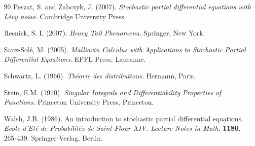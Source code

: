 \documentclass[12pt]{article}
\begin{document}
\begin{thebibliography}{99}
  Peszat, S. and Zabczyk, J. (2007). {\em Stochastic partial differential equations with L\'evy noise}. Cambridge University Press.
     
 
 Resnick, S. I. (2007). {\em Heavy Tail Phenomena}. 
 Springer, New York.         


   
 Sanz-Sol\'e, M. (2005). {\em Malliavin Calculus with Applications to Stochastic Partial Differential Equations}. EPFL Press, Lausanne.    
 
 Schwartz, L. (1966). {\em Th\'eorie des distributions.} Hermann, Paris.
 
 
 Stein, E.M. (1970). {\em Singular Integrals and Differentiability Properties of Functions}. Princeton University Press, Princeton.
    
 Walsh, J.B. (1986). An introduction to stochastic partial
differential equations. {\em Ecole d'Et\'{e} de Probabilit\'{e}s
de Saint-Flour XIV. Lecture Notes in Math.} {\bf 1180}, 265-439. Springer-Verlag, Berlin.    

     
\end{thebibliography}
\end{document}
